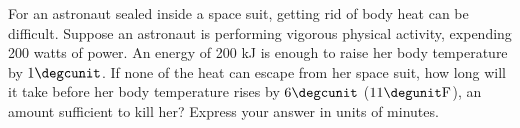 For an astronaut
sealed inside a space suit, getting rid of body heat can be
difficult. Suppose an astronaut is performing vigorous
physical activity, expending 200 watts of power. An energy
of 200 kJ is enough to raise her body temperature by $1\degcunit$.
If none of
the heat can escape from her space suit, how long will it
take before her body temperature rises by $6\degcunit$
($11\degunit\textup{F}$), an amount  sufficient to kill her?
Express your answer in units of minutes.\answercheck
